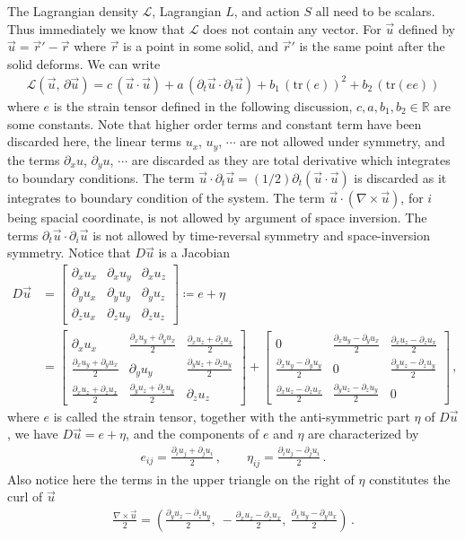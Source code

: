 \documentclass[11pt, onesided]{book}
\theoremstyle{break}
\theoremstyle{break}
\newcommand{\R}{\mathbb{R}}
\newcommand{\pd}{\partial}
\newcommand{\bmat}[1]{\begin{bmatrix} #1 \end{bmatrix}}
\begin{document}
The Lagrangian density $\mathcal{L}$, Lagrangian $L$, and action $S$ all need to be scalars. Thus immediately we know that $\mathcal{L}$ does not contain any vector. For $\vec{u}$ defined by $\vec{u} = \vec{r}' - \vec{r}$ where $\vec{r}$ is a point in some solid, and $\vec{r}'$ is the same point after the solid deforms. We can write
\begin{align}
\mathcal{L}(\vec{u},\, \pd \vec{u}) = c\,(\vec{u}\cdot \vec{u}) + a\, (\pd_t\vec{u}\cdot \pd_t \vec{u}) + b_1\, (\text{tr}(e))^2 + b_2\,(\text{tr}(ee))
\end{align}
where $e$ is the strain tensor defined in the following discussion, $c,a,b_1,b_2 \in \R$ are some constants. Note that higher order terms and constant term have been discarded here, the linear terms $u_x$, $u_y$, $\cdots$ are not allowed under symmetry, and the terms  $\pd_x u$, $\pd_y u$, $\cdots$ are discarded as they are total derivative which integrates to boundary conditions. The term $\vec{u}\cdot \pd_t \vec{u} = (1/2)\pd_t (\vec{u}\cdot \vec{u})$ is discarded as it integrates to boundary condition of the system. The term $\vec{u}\cdot (\nabla \times \vec{u})$, for $i$ being spacial coordinate, is not allowed by argument of space inversion. The terms $\pd_t \vec{u}\cdot\pd_i \vec{u}$ is not allowed by time-reversal symmetry and space-inversion symmetry. Notice that $D\vec{u}$ is a Jacobian
\begin{align*}
D\vec{u} &= \bmat{
\pd_x u_x & \pd_x u_y & \pd_x u_z\\
\pd_y u_x & \pd_y u_y & \pd_y u_z\\
\pd_z u_x & \pd_z u_y & \pd_z u_z
} \coloneqq e+\eta
\\
&=
\bmat{
\pd_x u_x & \frac{\pd_x u_y+\pd_y u_x}{2} & \frac{\pd_x u_z + \pd_z u_x}{2}\\
\frac{\pd_x u_y + \pd_y u_x}{2} & \pd_y u_y & \frac{\pd_y u_z + \pd_zu_y}{2}\\
\frac{\pd_x u_z + \pd_z u_x}{2} & \frac{\pd_y u_z + \pd_z u_y}{2} & \pd_zu_z
} + 
\bmat{
0 & \frac{\pd_x u_y-\pd_y u_x}{2} & \frac{\pd_x u_z - \pd_z u_x}{2}\\
\frac{\pd_xu_y - \pd_yu_y}{2} & 0 & \frac{\pd_y u_z - \pd_zu_y}{2}\\
\frac{\pd_x u_z - \pd_z u_x}{2} & \frac{\pd_y u_z - \pd_z u_y}{2} & 0
} 
\,,
\end{align*}
where $e$ is called the strain tensor, together with the anti-symmetric part $\eta$ of $D\vec{u}$, we have $D\vec{u} = e+\eta$, and the components of $e$ and $\eta$ are characterized by
\begin{align*}
e_{ij} = \frac{\pd_i u_j + \pd_j u_i}{2} \,,\qquad 
\eta_{ij} = \frac{\pd_i u_j -\pd_j u_i}{2}\,.
\end{align*}
Also notice here the terms in the upper triangle on the right of $\eta$ constitutes the curl of $\vec{u}$
\begin{align*}
\frac{\nabla \times \vec{u}}{2} = \left( \frac{\pd_y u_z - \pd_z u_y}{2}, \ -\frac{\pd_x u_z - \pd_z u_x}{2},\ \frac{\pd_x u_y - \pd_y u_x}{2}\right)\,.
\end{align*} 
\end{document}
